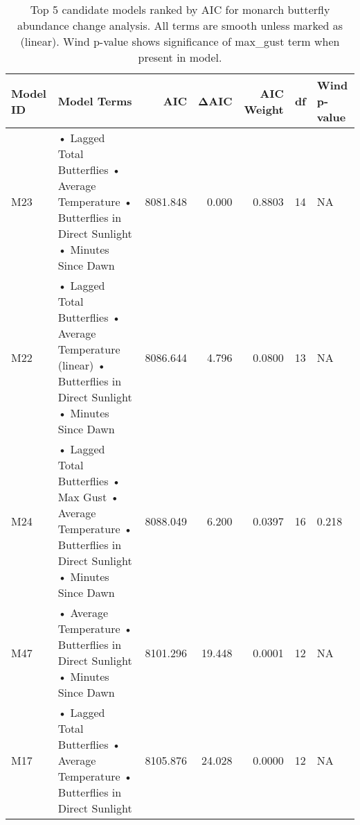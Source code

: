 \begin{table}

\caption{Top 5 candidate models ranked by AIC for monarch butterfly abundance change analysis. All terms are smooth unless marked as (linear). Wind p-value shows significance of max_gust term when present in model.}
\centering
\begin{tabular}[t]{llrrrrl}
\toprule
Model ID & Model Terms & AIC & ΔAIC & AIC Weight & df & Wind p-value\\
\midrule
M23 & • Lagged Total Butterflies
• Average Temperature
• Butterflies in Direct Sunlight
• Minutes Since Dawn & 8081.848 & 0.000 & 0.8803 & 14 & NA\\
M22 & • Lagged Total Butterflies
• Average Temperature (linear)
• Butterflies in Direct Sunlight
• Minutes Since Dawn & 8086.644 & 4.796 & 0.0800 & 13 & NA\\
M24 & • Lagged Total Butterflies
• Max Gust
• Average Temperature
• Butterflies in Direct Sunlight
• Minutes Since Dawn & 8088.049 & 6.200 & 0.0397 & 16 & 0.218\\
M47 & • Average Temperature
• Butterflies in Direct Sunlight
• Minutes Since Dawn & 8101.296 & 19.448 & 0.0001 & 12 & NA\\
M17 & • Lagged Total Butterflies
• Average Temperature
• Butterflies in Direct Sunlight & 8105.876 & 24.028 & 0.0000 & 12 & NA\\
\bottomrule
\end{tabular}
\end{table}
